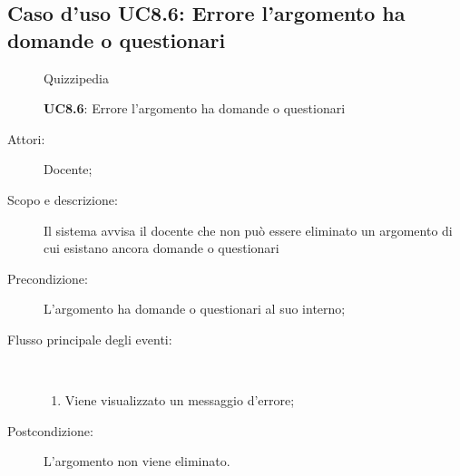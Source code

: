 \subsection{Caso d'uso UC8.6: Errore l'argomento ha domande o questionari}
	\begin{figure}[H]
		\centering
		\begin{resizedtikzpicture}{\textwidth}
		\begin{umlsystem}[x=0, fill=lightgray!20]{Quizzipedia}
		\end{umlsystem}
		\end{resizedtikzpicture}
		\caption{\textbf{UC8.6}: Errore l'argomento ha domande o questionari}
		\label{UC8.6}
	\end{figure}
\begin{description}
\item[Attori:] Docente;
\item[Scopo e descrizione:] Il sistema avvisa il docente che non può essere eliminato un argomento di cui esistano ancora domande o questionari
      \item[Precondizione:] L'argomento ha domande o questionari al suo interno;

        \item[Flusso principale degli eventi:] \ 
 \begin{enumerate}
          \item Viene visualizzato un messaggio d'errore;

      \end{enumerate}
    \item[Postcondizione:] L'argomento non viene eliminato.
  \end{description}
\hypertarget{UC9}{}
